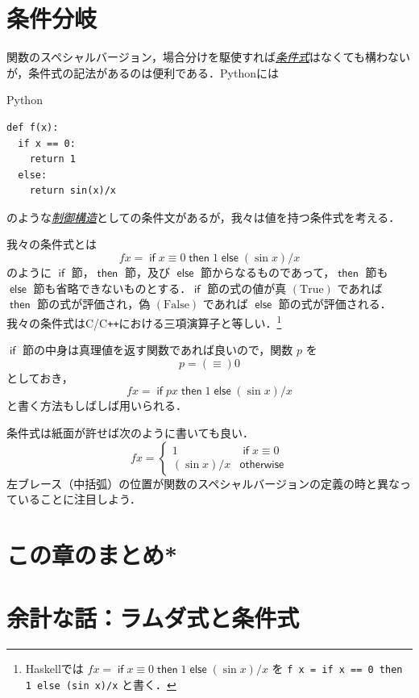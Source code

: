 \documentclass[a4paper]{jsbook}
\newcommand{\programminglanguage}[1]{\textsf{#1}}
\newcommand{\clang}{\programminglanguage{C}}
\newcommand{\cxx}{\programminglanguage{C}\texttt{++}}
\newcommand{\haskell}{\programminglanguage{Haskell}}
\newcommand{\python}{\programminglanguage{Python}}
\newcommand{\keyword}[1]{{\underline{\emph{#1}}}}
\newcommand{\code}[1]{\texttt{#1}}
\newenvironment{pythoncode}{\begin{itembox}[r]{\python}}{\end{itembox}}
\newcommand{\mSpecialConst}[1]{\mathrm{#1}} %
\newcommand{\mTrue}{\mSpecialConst{True}}
\newcommand{\mFalse}{\mSpecialConst{False}}
\newcommand{\mKeyword}[1]{\mathsf{#1}}
\newcommand{\mIfKeyword}{\mKeyword{if}}
\newcommand{\mOtherwiseKeyword}{\mKeyword{otherwise}}
\newcommand{\mThenKeyword}{\mKeyword{then}}
\newcommand{\mElseKeyword}{\mKeyword{else}}
\DeclareMathOperator{\mIf}{\mIfKeyword}
\DeclareMathOperator{\mOtherwise}{\mOtherwiseKeyword}
\DeclareMathOperator{\mThen}{\mThenKeyword}
\DeclareMathOperator{\mElse}{\mElseKeyword}
\newcommand{\mIfThenElse}[3]{\mIf{#1}\mThen{#2}\mElse{#3}}
\begin{document}
\section{条件分岐}
\label{sec:if}

関数のスペシャルバージョン，場合分けを駆使すれば\keyword{条件式}はなくても構わないが，条件式の記法があるのは便利である．\python には
\begin{pythoncode}
\begin{verbatim}
def f(x):
  if x == 0:
    return 1
  else:
    return sin(x)/x
\end{verbatim}
\end{pythoncode}
のような\keyword{制御構造}としての条件文があるが，我々は値を持つ条件式を考える．

我々の条件式とは
\begin{equation}
fx
=\mIfThenElse{x\equiv0}{1}{{}(\sin x)/x}
\end{equation}
のように $\mIf$ 節，$\mThen$ 節，及び $\mElse$ 節からなるものであって，$\mThen$ 節も $\mElse$ 節も省略できないものとする．$\mIf$ 節の式の値が真 $(\mTrue)$ であれば $\mThen$ 節の式が評価され，偽 $(\mFalse)$ であれば $\mElse$ 節の式が評価される．我々の条件式は\clang/\cxx における三項演算子と等しい．\footnote{\haskell では $fx=\mIfThenElse{x\equiv0}{1}{{}(\sin x)/x}$ を \code{f x = if x == 0 then 1 else (sin x)/x} と書く．}

$\mIf$ 節の中身は真理値を返す関数であれば良いので，関数 $p$ を
\begin{equation}
p=(\equiv)0
\end{equation}
としておき，
\begin{equation}
fx=\mIfThenElse{px}{1}{{}(\sin x)/x}
\end{equation}
と書く方法もしばしば用いられる．

条件式は紙面が許せば次のように書いても良い．
\begin{equation}
fx=\begin{cases}
1&\mIf x\equiv0\\
(\sin x)/x&\mOtherwise
\end{cases}
\end{equation}
左ブレース（中括弧）の位置が関数のスペシャルバージョンの定義の時と異なっていることに注目しよう．

\section*{この章のまとめ*}

\section{余計な話：ラムダ式と条件式}
\end{document}
